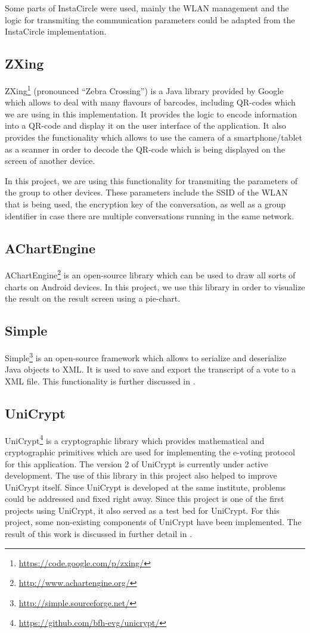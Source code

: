 \documentclass[numbers=noenddot, abstract=on, a4paper, headsepline,
footsepline, oneside, draft=off]{scrreprt}
\begin{document}
Some parts of InstaCircle were used, mainly the WLAN management and the logic
for transmiting the communication parameters could be adapted from the
InstaCircle implementation.

\subsection{ZXing}
\label{sec:zxing}
ZXing\footnote{\url{https://code.google.com/p/zxing/}} (pronounced ``Zebra
Crossing'') is a Java library provided by Google which allows to deal with many
flavours of barcodes, including QR-codes which we are using in this
implementation. It provides the logic to encode information into a QR-code and
display it on the user interface of the application. It also provides the
functionality which allows to use the camera of a smartphone/tablet as a scanner
in order to decode the QR-code which is being displayed on the screen of another
device.

In this project, we are using this functionality for transmiting the parameters
of the group to other devices. These parameters include the SSID of the WLAN
that is being used, the encryption key of the conversation, as well as a group
identifier in case there are multiple conversations running in the same network.

\subsection{AChartEngine}
\label{sec:achartengine}
AChartEngine\footnote{\url{http://www.achartengine.org/}} is an open-source
library which can be used to draw all sorts of charts on Android devices. In
this project, we use this library in order to visualize the result on the
result screen using a pie-chart.

\subsection{Simple}
\label{sec:simple}
Simple\footnote{\url{http://simple.sourceforge.net/}} is an open-source
framework which allows to serialize and deserialize Java objects to XML. It is
used to save and export the transcript of a vote to a XML file. This
functionality is further discussed in . 

\subsection{UniCrypt}
\label{sec:unicrypt}
UniCrypt\footnote{\url{https://github.com/bfh-evg/unicrypt/}} is a cryptographic
library which provides mathematical and cryptographic primitives which are used
for implementing the e-voting protocol for this application. The version 2 of
UniCrypt is currently under active development. The use of this library in this
project also helped to improve UniCrypt itself. Since UniCrypt is developed at
the same institute, problems could be addressed and fixed right away. Since
this project is one of the first projects using UniCrypt, it also served as a test
bed for UniCrypt. For this project, some non-existing components of UniCrypt
have been implemented. The result of this work is discussed in further detail in
.
\end{document}
